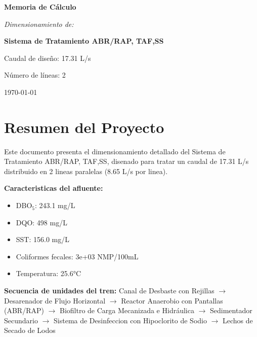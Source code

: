 \documentclass[12pt,a4paper]{article}
\begin{document}
\begin{titlepage}
\centering
\vspace*{2cm}

{\Huge\bfseries Memoria de Cálculo\par}
\vspace{1.5cm}

{\Large\itshape Dimensionamiento de:\par}
\vspace{0.5cm}

{\LARGE\bfseries Sistema de Tratamiento ABR/RAP, TAF,SS\par}
\vspace{2cm}

{\large Caudal de diseño: 17.31 L/s\par}
{\large Número de líneas: 2\par}
\vfill
{\large\today\par}
\end{titlepage}

\tableofcontents

\listoffigures

\listoftables

\newpage
\section{Resumen del Proyecto}

Este documento presenta el dimensionamiento detallado del Sistema de Tratamiento ABR/RAP, TAF,SS, disenado para tratar un caudal de 17.31 L/s distribuido en 2 lineas paralelas (8.65 L/s por linea).

\textbf{Caracteristicas del afluente:}
\begin{itemize}
    \item DBO$_5$: 243.1 mg/L
    \item DQO: 498 mg/L
    \item SST: 156.0 mg/L
    \item Coliformes fecales: 3e+03 NMP/100mL
    \item Temperatura: 25.6°C
\end{itemize}

\textbf{Secuencia de unidades del tren:} 
Canal de Desbaste con Rejillas $\rightarrow$ Desarenador de Flujo Horizontal $\rightarrow$ Reactor Anaerobio con Pantallas (ABR/RAP) $\rightarrow$ Biofiltro de Carga Mecanizada e Hidráulica $\rightarrow$ Sedimentador Secundario $\rightarrow$ Sistema de Desinfeccion con Hipoclorito de Sodio $\rightarrow$ Lechos de Secado de Lodos
\end{document}
